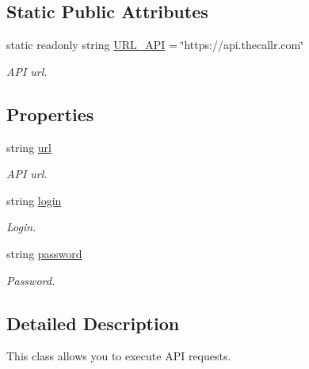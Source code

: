 \subsection*{Static Public Attributes}
\begin{DoxyCompactItemize}
\item 
static readonly string \hyperlink{class_thecallr_api_1_1_json_1_1_json_rpc_client_a089929699b48b819ef921c49851da1ad}{U\+R\+L\+\_\+\+A\+P\+I} = \char`\"{}https\+://api.\+thecallr.\+com\char`\"{}
\begin{DoxyCompactList}\small\item\em A\+P\+I url. \end{DoxyCompactList}\end{DoxyCompactItemize}
\subsection*{Properties}
\begin{DoxyCompactItemize}
\item 
string \hyperlink{class_thecallr_api_1_1_json_1_1_json_rpc_client_af0e422ceb48e0e60ea2931a60f5b3e29}{url}
\begin{DoxyCompactList}\small\item\em A\+P\+I url. \end{DoxyCompactList}\item 
string \hyperlink{class_thecallr_api_1_1_json_1_1_json_rpc_client_a5abb517979932f03537abbff5007e4fa}{login}
\begin{DoxyCompactList}\small\item\em Login. \end{DoxyCompactList}\item 
string \hyperlink{class_thecallr_api_1_1_json_1_1_json_rpc_client_aefa7c23e20a776ca0862d47dffab33ce}{password}
\begin{DoxyCompactList}\small\item\em Password. \end{DoxyCompactList}\end{DoxyCompactItemize}


\subsection{Detailed Description}
This class allows you to execute A\+P\+I requests. 



